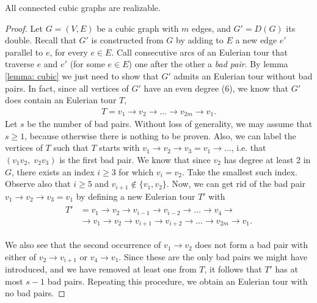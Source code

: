 \documentclass[12pt,a4paper,titlepage,openany]{report}
\begin{document}
\begin{theorem}
	All connected cubic graphs are realizable.
\end{theorem}

\begin{proof}
	Let $G = (V, E)$ be a cubic graph with $m$ edges, and $G' = D(G)$ its double. Recall that $G'$ is constructed from $G$ by adding to $E$ a new edge $e'$ parallel to $e$, for every $e \in E$. Call consecutive arcs of an Eulerian tour that traverse $e$ and $e'$ (for some $e \in E$) one after the other a \emph{bad pair}. By lemma \ref{lemma: cubic} we just need to show that $G'$ admits an Eulerian tour without bad pairs. In fact, since all vertices of $G'$ have an even degree (6), we know that $G'$ does contain an Eulerian tour $T$, 
	\begin{align} T = v_1 \rightarrow v_2 \rightarrow \dots \rightarrow v_{2m} \rightarrow v_1.
	\end{align}
	Let $s$ be the number of bad pairs. Without loss of generality, we may assume that $s\geq 1$, because otherwise there is nothing to be proven. Also, we can label the vertices of $T$ such that $T$ starts with $v_1 \rightarrow v_2 \rightarrow v_3 = v_1 \rightarrow\dots$, i.e. that $(v_1v_2,\;v_2v_3)$ is the first bad pair. We know that since $v_2$ has degree at least 2 in $G$, there exists an index $i \geq 3$ for which $v_i = v_2$. Take the smallest such index. Observe also that $i \geq 5$ and $v_{i+1}\notin \{v_1, v_2\}$. Now, we can get rid of the bad pair $v_1 \rightarrow v_2 \rightarrow v_3 = v_1$ by defining a new Eulerian tour $T'$ with
	\begin{align}
	\begin{split}
	T' &= v_1 \rightarrow v_2 \rightarrow v_{i-1} \rightarrow v_{i-2} \rightarrow \dots \rightarrow v_4 \rightarrow \\ &\rightarrow v_1 \rightarrow v_2 \rightarrow v_{i+1} \rightarrow v_{i+2} \rightarrow \dots \rightarrow v_{2m} \rightarrow v_1.
	\end{split}  
	\end{align}
	
	We also see that the second occurrence of $v_1 \rightarrow v_2$ does not form a bad pair with either of $v_2 \rightarrow v_{i+1}$ or $v_4 \rightarrow v_1$. Since these are the only bad pairs we might have introduced, and we have removed at least one from $T$, it follows that $T'$ has at most $s-1$ bad pairs. Repeating this procedure, we obtain an Eulerian tour with no bad pairs.
\end{proof}
\end{document}
